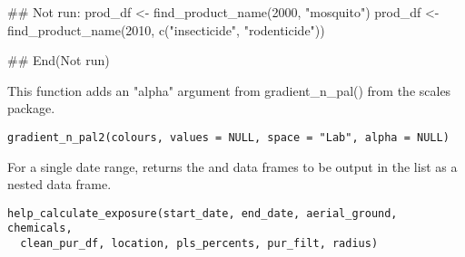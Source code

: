 \documentclass[a4paper]{book}
\begin{document}
%
\begin{Examples}
\begin{ExampleCode}
## Not run:
prod_df <- find_product_name(2000, "mosquito")
prod_df <- find_product_name(2010, c("insecticide", "rodenticide"))

## End(Not run)
\end{ExampleCode}
\end{Examples}
%
\begin{Description}\relax
This function adds an "alpha" argument from gradient\_n\_pal() from the scales
package.
\end{Description}
%
\begin{Usage}
\begin{verbatim}
gradient_n_pal2(colours, values = NULL, space = "Lab", alpha = NULL)
\end{verbatim}
\end{Usage}
%
\begin{Description}\relax
For a single date range,  returns the
 and  data frames to be output in the
 list as a nested data frame.
\end{Description}
%
\begin{Usage}
\begin{verbatim}
help_calculate_exposure(start_date, end_date, aerial_ground, chemicals,
  clean_pur_df, location, pls_percents, pur_filt, radius)
\end{verbatim}
\end{Usage}
%
\end{document}
